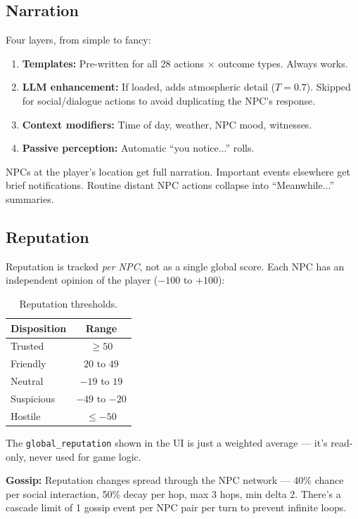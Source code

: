 \subsection{Narration}

Four layers, from simple to fancy:

\begin{enumerate}
    \item \textbf{Templates:} Pre-written for all 28 actions $\times$ outcome types. Always works.
    \item \textbf{LLM enhancement:} If loaded, adds atmospheric detail ($T = 0.7$). Skipped for social/dialogue actions to avoid duplicating the NPC's response.
    \item \textbf{Context modifiers:} Time of day, weather, NPC mood, witnesses.
    \item \textbf{Passive perception:} Automatic ``you notice...'' rolls.
\end{enumerate}

NPCs at the player's location get full narration. Important events elsewhere get brief notifications. Routine distant NPC actions collapse into ``Meanwhile...'' summaries.

\subsection{Reputation}

Reputation is tracked \emph{per NPC}, not as a single global score. Each NPC has an independent opinion of the player ($-100$ to $+100$):

\begin{table}[ht]
\centering
\caption{Reputation thresholds.}
\label{tab:reputation}
\begin{tabular}{@{}lc@{}}
\toprule
Disposition & Range \\
\midrule
Trusted & $\geq 50$ \\
Friendly & $20$ to $49$ \\
Neutral & $-19$ to $19$ \\
Suspicious & $-49$ to $-20$ \\
Hostile & $\leq -50$ \\
\bottomrule
\end{tabular}
\end{table}

The \texttt{global\_reputation} shown in the UI is just a weighted average --- it's read-only, never used for game logic.

\textbf{Gossip:} Reputation changes spread through the NPC network --- 40\% chance per social interaction, 50\% decay per hop, max 3 hops, min delta 2. There's a cascade limit of 1 gossip event per NPC pair per turn to prevent infinite loops.

